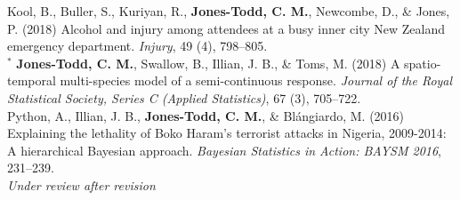 \documentclass[10pt,a4paper]{moderncv}
\begin{document}
\vspace{-3pt}
Kool, B., Buller, S., Kuriyan, R., \textbf{Jones-Todd, C. M.}, Newcombe, D., \& Jones, P. (2018) Alcohol and injury among attendees at a busy inner city New Zealand emergency department. \textit{Injury}, 49 (4), 798--805.\\


  ${}^\ast$ \textbf{Jones-Todd, C. M.}, Swallow, B., Illian, J. B., \& Toms, M. (2018) A spatio-temporal multi-species model of a semi-continuous response. \textit{Journal of the Royal Statistical Society, Series C (Applied Statistics)}, 67 (3), 705--722.\\

\vspace{-3pt}
Python, A.,  Illian, J. B., \textbf{Jones-Todd, C. M.}, \& Bl\'{a}ngiardo, M. (2016) Explaining the lethality of Boko Haram’s terrorist attacks in Nigeria, 2009-2014: A hierarchical Bayesian approach. \textit{Bayesian Statistics in Action: BAYSM 2016}, 231--239.\\


\textit{\small{Under review after revision}}\\









\vspace{5pt}
\end{document}
